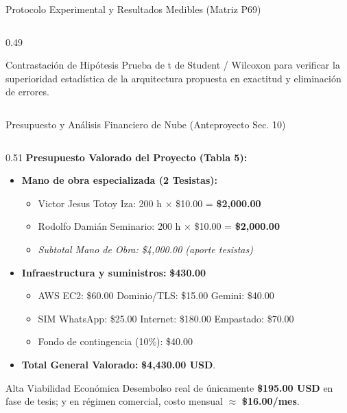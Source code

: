 \documentclass[aspectratio=169, 10pt]{beamer}
\begin{document}
\begin{frame}{Protocolo Experimental y Resultados Medibles (Matriz P69)}
\begin{columns}[t]
\begin{column}{0.49\textwidth}
      \vspace{0.05cm}
      \begin{exampleblock}{Contrastación de Hipótesis}
        \scriptsize
        Prueba de t de Student / Wilcoxon para verificar la superioridad estadística de la arquitectura propuesta en exactitud y eliminación de errores.
      \end{exampleblock}
    \end{column}
  \end{columns}
\end{frame}

\begin{frame}{Presupuesto y Análisis Financiero de Nube (Anteproyecto Sec. 10)}
  \begin{columns}[t]
    \begin{column}{0.51\textwidth}
      \textbf{Presupuesto Valorado del Proyecto (Tabla 5):}
      \begin{itemize}\footnotesize\setlength{\itemsep}{1pt}
        \item \textbf{Mano de obra especializada (2 Tesistas):}
          \begin{itemize}\scriptsize
            \item Victor Jesus Totoy Iza: 200 h $\times$ \$10.00 = \textbf{\$2,000.00}
            \item Rodolfo Damián Seminario: 200 h $\times$ \$10.00 = \textbf{\$2,000.00}
            \item \textit{Subtotal Mano de Obra: \$4,000.00 (aporte tesistas)}
          \end{itemize}
        \item \textbf{Infraestructura y suministros:} \textbf{\$430.00}
          \begin{itemize}\scriptsize
            \item AWS EC2: \$60.00 \quad Dominio/TLS: \$15.00 \quad Gemini: \$40.00
            \item SIM WhatsApp: \$25.00 \quad Internet: \$180.00 \quad Empastado: \$70.00
            \item Fondo de contingencia (10\%): \$40.00
          \end{itemize}
        \item \textbf{Total General Valorado:} \textbf{\$4,430.00 USD}.
      \end{itemize}
      
      \vspace{0.1cm}
      \begin{exampleblock}{Alta Viabilidad Económica}
        \scriptsize
        Desembolso real de únicamente \textbf{\$195.00 USD} en fase de tesis; y en régimen comercial, costo mensual $\approx$ \textbf{\$16.00/mes}.
      \end{exampleblock}
    \end{column}
    

\end{columns}
\end{frame}
\end{document}
